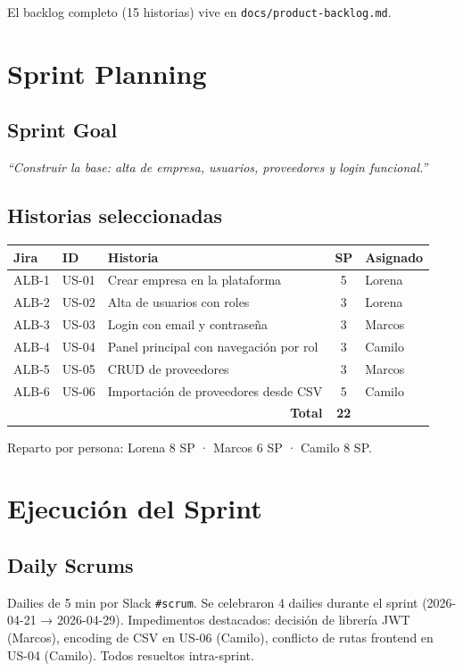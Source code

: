 \documentclass[11pt,a4paper]{article}
\begin{document}
El backlog completo (15 historias) vive en \texttt{docs/product-backlog.md}.

\section{Sprint Planning}
\subsection{Sprint Goal}
\emph{``Construir la base: alta de empresa, usuarios, proveedores y login funcional.''}

\subsection{Historias seleccionadas}

\begin{tabular}{lllcl}
\toprule
\textbf{Jira} & \textbf{ID} & \textbf{Historia} & \textbf{SP} & \textbf{Asignado} \\
\midrule
ALB-1 & US-01 & Crear empresa en la plataforma       & 5 & Lorena \\
ALB-2 & US-02 & Alta de usuarios con roles           & 3 & Lorena \\
ALB-3 & US-03 & Login con email y contraseña         & 3 & Marcos \\
ALB-4 & US-04 & Panel principal con navegación por rol & 3 & Camilo \\
ALB-5 & US-05 & CRUD de proveedores                  & 3 & Marcos \\
ALB-6 & US-06 & Importación de proveedores desde CSV & 5 & Camilo \\
\midrule
\multicolumn{3}{r}{\textbf{Total}} & \textbf{22} & \\
\bottomrule
\end{tabular}

\vspace{0.3em}
Reparto por persona: Lorena 8 SP · Marcos 6 SP · Camilo 8 SP.

\section{Ejecución del Sprint}
\subsection{Daily Scrums}
Dailies de 5 min por Slack \texttt{\#scrum}. Se celebraron 4 dailies durante el sprint (2026-04-21 → 2026-04-29). Impedimentos destacados: decisión de librería JWT (Marcos), encoding de CSV en US-06 (Camilo), conflicto de rutas frontend en US-04 (Camilo). Todos resueltos intra-sprint.
\end{document}
